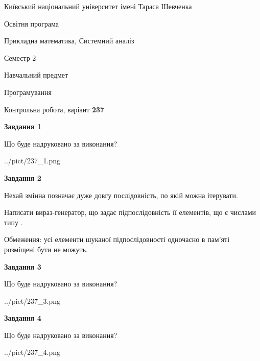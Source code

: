 \documentclass[12pt, ukrainian]{article}
\begin{document}
{{\begin {small}\par
{ \center  Київський національний університет імені Тараса Шевченка \par}
{\parbox {5 cm}{Освітня програма \hfill}{\parbox {8 cm}{Прикладна математика, Системний аналіз \hfill}}\parbox {5 cm}{\hfill Семестр 2}}\par
{\parbox {5 cm} {Навчальний предмет \hfill}\parbox {7 cm}{Програмування \hfill}\parbox {6cm}{\hfill}\par}\vspace{-7pt} \end{small}}{\center Контрольна робота, варіант  \No \textbf
{ 237 }\par}}
{
\begin {large}
{\begin {center}\textbf{Завдання 1}\end {center}}\par
Що буде надруковано за виконання?\par\par
\begin{center}
	{../pict/237_1.png}
\end{center}
\newpage

{\begin {center}\textbf{Завдання 2}\end {center}}\par
Нехай змінна  позначає дуже довгу послідовність, по якій можна ітерувати.

Написати вираз-генератор, що задає підпослідовність її елементів, що є числами типу .

Обмеження: усі елементи шуканої підпослідовності одночасно в пам'яті розміщені бути не можуть.\par
\newpage

{\begin {center}\textbf{Завдання 3}\end {center}}\par
Що буде надруковано за виконання?\par
\begin{center}
	{../pict/237_3.png}
\end{center}
\newpage

{\begin {center}\textbf{Завдання 4}\end {center}}\par
Що буде надруковано за виконання?\par
\begin{center}
	{../pict/237_4.png}
\end{center}
\newpage


\end{large}}
\end{document}
